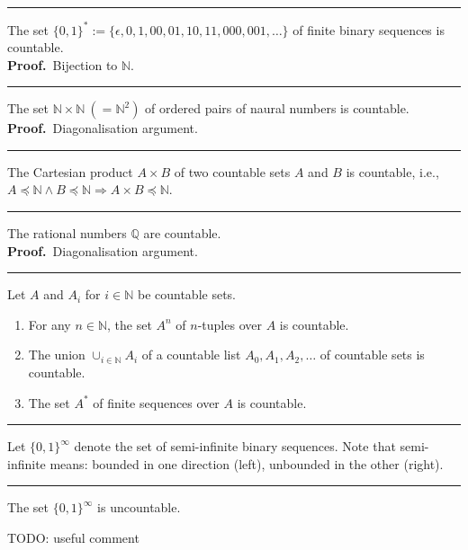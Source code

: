 \documentclass[a4paper]{extarticle}
\newcommand{\Proof}{\textbf{Proof.}\ }
\newcommand{\N}{\mathbb{N}}
\newcommand{\Q}{\mathbb{Q}}
\newcommand{\sep}{\vspace{5pt}\noindent\hrule\vspace{5pt}}
\begin{document}
\begin{multicols*}{2}
\sep

\Thm The set $\{0,1\}^*:=\{\epsilon, 0, 1, 00, 01, 10, 11, 000, 001,
\ldots\}$ of finite binary sequences is countable.
\\
\Proof Bijection to $\N$.

\sep

\Thm The set $\N\times \N \ (=\N^2)$ of ordered pairs of naural numbers is
countable.
\\
\Proof Diagonalisation argument.

\sep

\Cor The Cartesian product $A\times B$ of two countable sets $A$ and $B$
is countable, i.e., $A\preceq\N \land B\preceq \N \Longrightarrow A\times
B\preceq \N$.

\sep

\Cor The rational numbers $\Q$ are countable.
\\ 
\Proof Diagonalisation argument.

\sep

\Thm Let $A$ and $A_i$ for $i\in \N$ be countable sets.
\begin{enumerate}[label=(\roman*)]
  \item For any $n\in \N$, the set $A^n$ of $n$-tuples over $A$ is countable.
  \item The union $\cup_{i\in \N}A_i$ of a countable list $A_0,A_1,A_2,\ldots$
  of countable sets is countable.
  \item The set $A^*$ of finite sequences over $A$ is countable.
\end{enumerate}

\sep

\Def Let $\{0,1\}^\infty$ denote the set of semi-infinite binary sequences. Note
that semi-infinite means: bounded in one direction (left), unbounded in the
other (right).

\sep

\Thm The set $\{0,1\}^\infty$ is uncountable.

 TODO: useful comment

\end{multicols*}
\end{document}
